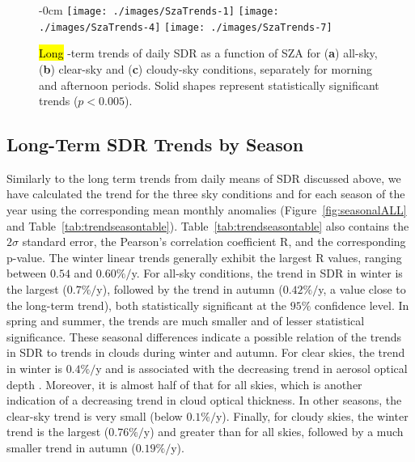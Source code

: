 \documentclass[applsci,article,accept,moreauthors,pdftex]{Definitions/mdpi}
\begin{document}
\begin{figure}[H]
    \begin{adjustwidth}{-\extralength}{0cm}
        {\centering 
                {\texttt{[image: ./images/SzaTrends-1]}}\hfill
                {\texttt{[image: ./images/SzaTrends-4]}}\hfill
                {\texttt{[image: ./images/SzaTrends-7]}}
        }

    \end{adjustwidth}
        \caption{\hl{Long} %
 -term trends of daily SDR as a function of SZA for (\textbf{a}) all-sky, (\textbf{b}) clear-sky and (\textbf{c}) cloudy-sky conditions, separately for morning and afternoon periods. Solid shapes represent statistically significant trends ($p < 0.005$).}\label{fig:szatrends}
\end{figure}

\hypertarget{long-term-sdr-trends-by-season}{%
\subsection{Long-Term SDR Trends by
Season}\label{long-term-sdr-trends-by-season}}

Similarly to the long term trends from daily means of SDR discussed
above, we have calculated the trend for the three sky conditions and for
each season of the year using the corresponding mean monthly anomalies
(Figure~\ref{fig:seasonalALL} and Table~\ref{tab:trendseasontable}).
Table~\ref{tab:trendseasontable} also contains the \(2\sigma\) standard
error, the Pearson's correlation coefficient R, and the corresponding
p-value. The winter linear trends generally exhibit the largest R values,
ranging between \(0.54\) and \(0.60\%/\)y. For all-sky conditions, the
trend in SDR in winter is the largest (\(0.7\%/\)y), followed by the
trend in autumn (\(0.42\%/\)y, a value close to the long-term trend),
both statistically significant at the \(95\%\) confidence level. In
spring and summer, the trends are much smaller and of lesser statistical
significance. These seasonal differences indicate a possible relation of
the trends in SDR to trends in clouds during winter and autumn. For
clear skies, the trend in winter is \(0.4\%/\)y and is associated with
the decreasing trend in aerosol optical depth \citep{Siomos2020}.
Moreover, it is almost half of that for all skies, which is another
indication of a decreasing trend in cloud optical thickness. In other
seasons, the clear-sky trend is very small (below \(0.1\%/\)y).
Finally, for cloudy skies, the winter trend is the largest
(\(0.76\%/\)y) and greater than for all skies, followed by a much
smaller trend in autumn (\(0.19\%/\)y).
\end{document}
